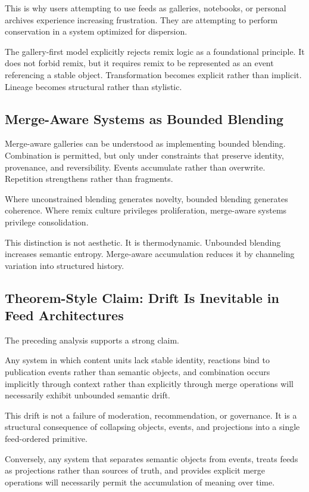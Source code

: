\documentclass[11pt,oneside]{article}
\begin{document}
This is why users attempting to use feeds as galleries, notebooks, or personal archives experience increasing frustration. They are attempting to perform conservation in a system optimized for dispersion.

The gallery-first model explicitly rejects remix logic as a foundational principle. It does not forbid remix, but it requires remix to be represented as an event referencing a stable object. Transformation becomes explicit rather than implicit. Lineage becomes structural rather than stylistic.

\subsection{Merge-Aware Systems as Bounded Blending}

Merge-aware galleries can be understood as implementing bounded blending. Combination is permitted, but only under constraints that preserve identity, provenance, and reversibility. Events accumulate rather than overwrite. Repetition strengthens rather than fragments.

Where unconstrained blending generates novelty, bounded blending generates coherence. Where remix culture privileges proliferation, merge-aware systems privilege consolidation.

This distinction is not aesthetic. It is thermodynamic. Unbounded blending increases semantic entropy. Merge-aware accumulation reduces it by channeling variation into structured history.

\subsection{Theorem-Style Claim: Drift Is Inevitable in Feed Architectures}

The preceding analysis supports a strong claim.

Any system in which content units lack stable identity, reactions bind to publication events rather than semantic objects, and combination occurs implicitly through context rather than explicitly through merge operations will necessarily exhibit unbounded semantic drift.

This drift is not a failure of moderation, recommendation, or governance. It is a structural consequence of collapsing objects, events, and projections into a single feed-ordered primitive.

Conversely, any system that separates semantic objects from events, treats feeds as projections rather than sources of truth, and provides explicit merge operations will necessarily permit the accumulation of meaning over time.
\end{document}
